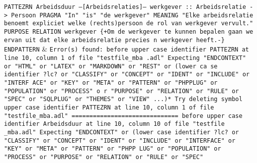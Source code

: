 \texttt{PATTEZRN Arbeidsduur\newline
  \newline
  --[Arbeidsrelaties]--\newline
  werkgever :: Arbeidsrelatie -> Persoon\newline
  PRAGMA "In" "is" "de werkgever"\newline
  MEANING "Elke arbeidsrelatie benoemt expliciet welke (rechts)persoon de rol van werkgever vervult."\newline
  PURPOSE RELATION werkgever\newline
  \{+Om de werkgever te kunnen bepalen gaan we ervan uit dat elke arbeidsrelatie precies n werkgever heeft.-\}\newline
  \newline
  ENDPATTERN} & \texttt{Error(s) found:\newline
  \newline
  before upper case identifier PATTEZRN at line 10, column 1 of file "testfile\_mba\newline
  .adl"\newline
  Expecting "ENDCONTEXT" or "HTML" or "LATEX" or "MARKDOWN" or "REST" or (lower ca\newline
  se identifier ?lc? or "CLASSIFY" or "CONCEPT" or "IDENT" or "INCLUDE" or "INTERF\newline
  ACE" or "KEY" or "META" or "PATTERN" or "PHPPLUG" or "POPULATION" or "PROCESS" o\newline
  r "PURPOSE" or "RELATION" or "RULE" or "SPEC" or "SQLPLUG" or "THEMES" or "VIEW"\newline
   ...)*\newline
  Try deleting symbol upper case identifier PATTEZRN at line 10, column 1 of file\newline
  "testfile\_mba.adl"\newline
  \newline
  ==============================\newline
  \newline
  before upper case identifier Arbeidsduur at line 10, column 10 of file "testfile\newline
  \_mba.adl"\newline
  Expecting "ENDCONTEXT" or (lower case identifier ?lc? or "CLASSIFY" or "CONCEPT"\newline
   or "IDENT" or "INCLUDE" or "INTERFACE" or "KEY" or "META" or "PATTERN" or "PHPP\newline
  LUG" or "POPULATION" or "PROCESS" or "PURPOSE" or "RELATION" or "RULE" or "SPEC"\newline
}

